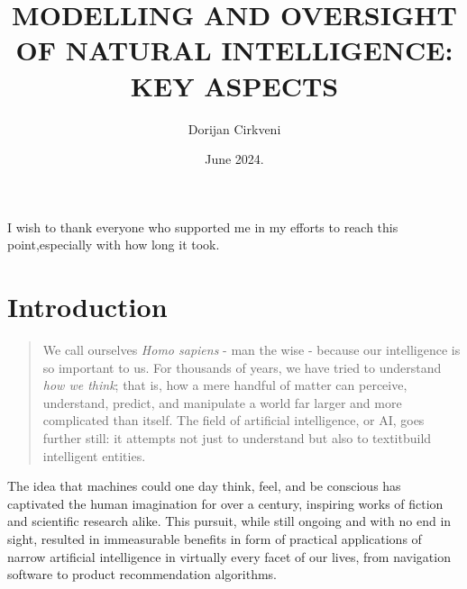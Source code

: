 \documentclass[masterthesis]{fer}
\title{MODELLING AND OVERSIGHT OF NATURAL
INTELLIGENCE: KEY ASPECTS}
\author{Dorijan Cirkveni}
\date{June 2024.}
\begin{document}
\maketitle






\begin{zahvale}
  I wish to thank everyone who supported me in my efforts to reach this point,especially with how long it took.
\end{zahvale}


\mainmatter


\tableofcontents


\chapter{Introduction}
\label{chp:introduction}
\begin{quote}
We call ourselves \textit{Homo sapiens}
- man the wise - because our intelligence is so important
to us. For thousands of years, we have tried to understand \textit{how we think};
that is, how a mere handful of matter can perceive, understand, predict, and manipulate a world far larger and
more complicated than itself. The field of artificial intelligence, or AI, goes further still: it
attempts not just to understand but also to textit{build} intelligent entities.
\cite{russell_norvig_2010}
\end{quote}

The idea that machines could one day think, feel, and be conscious has captivated the human imagination for over a century, inspiring works of fiction and scientific research alike.
This pursuit, while still ongoing and with no end in sight, resulted in immeasurable benefits in form of practical applications of narrow artificial intelligence in virtually every facet of our lives, from navigation software to product recommendation algorithms.
\end{document}
